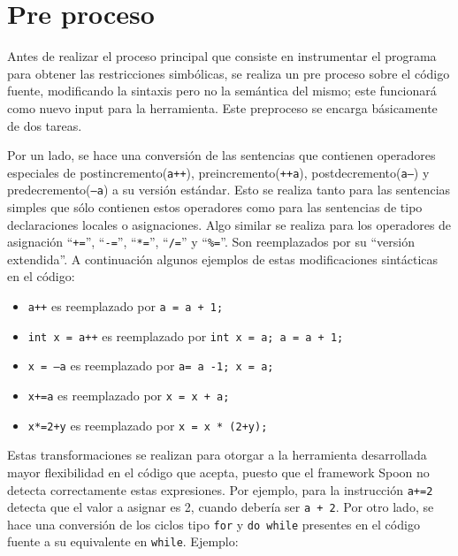 \documentclass{llncs}
\begin{document}
\section{Pre proceso}\label{apend.A}
Antes de realizar el proceso principal que consiste en instrumentar el programa para obtener las restricciones simbólicas, se realiza un pre proceso sobre el código fuente,
modificando la sintaxis pero no la semántica del mismo; este funcionará como nuevo input para la herramienta. Este preproceso se encarga básicamente de dos tareas.

Por un lado, se hace una conversión de las sentencias que contienen operadores especiales de postincremento(\texttt{a++}), preincremento(\texttt{++a}),
postdecremento(\texttt{a--}) y predecremento(\texttt{--a}) a su versión estándar. Esto se realiza tanto para las sentencias simples que sólo contienen estos operadores
como para las sentencias de tipo declaraciones locales o asignaciones. Algo similar se realiza para los operadores de asignación “\texttt{+=}”, “\texttt{-=}”, “\texttt{*=}”,
“\texttt{/=}” y “\texttt{\%=}”. Son reemplazados por su “versión extendida”. A continuación algunos ejemplos de estas modificaciones sintácticas en el código:
\begin{itemize}
  \item \texttt{a++} es reemplazado por \texttt{a = a + 1;}
  \item \texttt{int x = a++} es reemplazado por \texttt{int x = a; a = a + 1;}
  \item \texttt{x = --a} es reemplazado por \texttt{a= a -1; x = a;}
  \item \texttt{x+=a} es reemplazado por \texttt{x = x + a;}
  \item \texttt{x*=2+y} es reemplazado por \texttt{x = x * (2+y);}
\end{itemize}
Estas transformaciones se realizan para otorgar a la herramienta desarrollada mayor flexibilidad en el código que acepta, puesto que el framework Spoon
no detecta correctamente estas expresiones. Por ejemplo, para la instrucción \texttt{a+=2} detecta que el valor a asignar es 2, cuando debería ser \texttt{a + 2}.
Por otro lado, se hace una conversión de los ciclos tipo \texttt{for} y \texttt{do while} presentes en el código fuente a su equivalente en \texttt{while}. Ejemplo:
\end{document}
